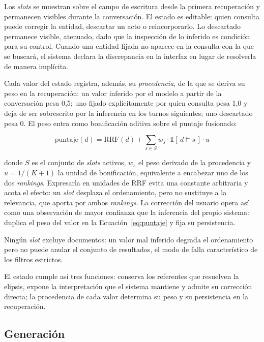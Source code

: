 \documentclass{llncs}
\begin{document}
Los \emph{slots} se muestran sobre el campo de escritura desde la primera
recuperación y permanecen visibles durante la conversación. El estado es
editable: quien consulta puede corregir la entidad, descartar un acto o
reincorporarlo. Lo descartado permanece
visible, atenuado, dado que la inspección de lo inferido es condición para su
control. Cuando una entidad fijada no aparece en la consulta con la que se
buscará, el sistema declara la discrepancia en la interfaz en lugar de
resolverla de manera implícita.

\label{sec:procedencia}Cada valor del estado registra, además, su
\emph{procedencia}, de la que se deriva su peso en la recuperación: un valor
inferido por el modelo a partir de la conversación pesa 0,5; uno fijado
explícitamente por quien consulta pesa 1,0 y deja de ser sobrescrito por la
inferencia en los turnos siguientes; uno descartado pesa 0. El peso entra como
bonificación aditiva sobre el puntaje fusionado:

\begin{equation}
\mathrm{puntaje}(d) = \mathrm{RRF}(d) + \sum_{s \in S} w_s \cdot \mathbb{1}[\,d \models s\,] \cdot u
\label{eq:puntaje}
\end{equation}

donde $S$ es el conjunto de \emph{slots} activos, $w_s$ el peso derivado de la
procedencia y $u = 1/(K+1)$ la unidad de bonificación, equivalente a encabezar
uno de los dos \emph{rankings}. Expresarla en unidades de RRF evita una
constante arbitraria y acota el efecto: un \emph{slot} desplaza el ordenamiento,
pero no sustituye a la relevancia, que aporta por ambos \emph{rankings}. La
corrección del usuario opera así como una observación de mayor confianza
que la inferencia del propio sistema: duplica el peso del valor en la
Ecuación~\ref{eq:puntaje} y fija su persistencia.

Ningún \emph{slot} excluye documentos: un valor mal inferido degrada el
ordenamiento pero no puede anular el conjunto de resultados, el modo de falla
característico de los filtros estrictos.

El estado cumple así tres funciones: conserva los referentes que resuelven la
elipsis, expone la interpretación que el sistema mantiene y admite su
corrección directa; la procedencia de cada valor determina su peso y su
persistencia en la recuperación.

\subsection{Generación}
\end{document}
